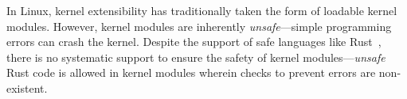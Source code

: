In Linux, kernel extensibility has traditionally taken the form of loadable kernel
    modules. However, kernel modules are inherently {\it unsafe}---simple programming
        errors can crash the kernel.
Despite the support of safe languages like Rust~\cite{rust-for-linux-doc},
    there is no systematic support to ensure the safety of kernel modules---\textit{unsafe} Rust code %
    is allowed in kernel modules %
    wherein checks to prevent errors are non-existent.
